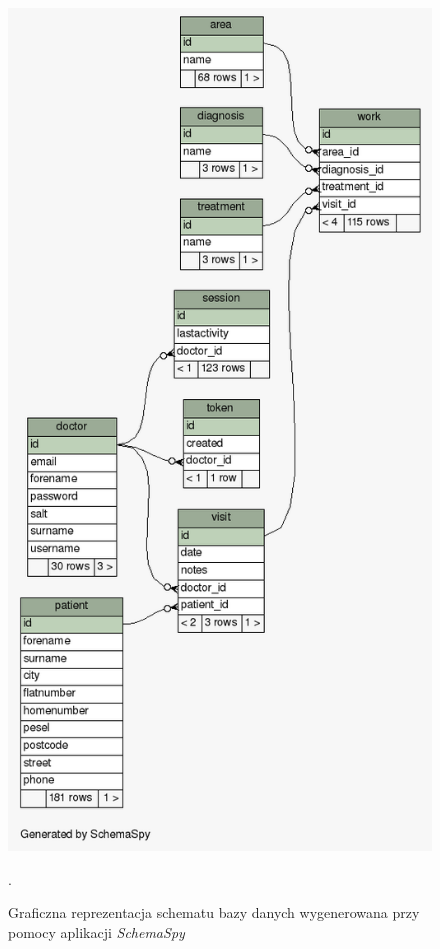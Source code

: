 \documentclass[11pt]{aghdpl}
\begin{document}
\begin{figure}[h!]
	\centering
	\includegraphics[height=\textheight * 4/5]{dbschema}
	\caption{Graficzna reprezentacja schematu bazy danych wygenerowana przy pomocy aplikacji \emph{SchemaSpy}}.
	\label{fig:dbschema}
\end{figure}
\end{document}

